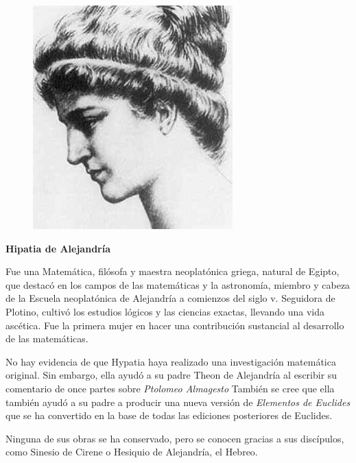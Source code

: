 \documentclass{article}
\begin{document}
\begin{figure}
    \centering
    \includegraphics[width=.6\textwidth]{Hypatia.jpeg}
    
    \label{fig:my_label}
\end{figure}

{\centering \textbf {Hipatia de Alejandría}\par}

\vspace{20mm}

 Fue una Matemática, filósofa y maestra neoplatónica griega, natural de Egipto, que destacó en los campos de las matemáticas y la astronomía, miembro y cabeza de la Escuela neoplatónica de Alejandría a comienzos del siglo v. Seguidora de Plotino, cultivó los estudios lógicos y las ciencias exactas, llevando una vida ascética. Fue la primera mujer en hacer una contribución sustancial al desarrollo de las matemáticas.
\vspace{5mm}

No hay evidencia de que Hypatia haya realizado una investigación matemática original. Sin embargo, ella ayudó a su padre Theon de Alejandría al escribir su comentario de once partes sobre \emph{Ptolomeo Almagesto} También se cree que ella también ayudó a su padre a producir una nueva versión de \emph{Elementos de Euclides} que se ha convertido en la base de todas las ediciones posteriores de Euclides.
\vspace{5mm}

Ninguna de sus obras se ha conservado, pero se conocen gracias a sus discípulos, como Sinesio de Cirene o Hesiquio de Alejandría, el Hebreo.
\end{document}

